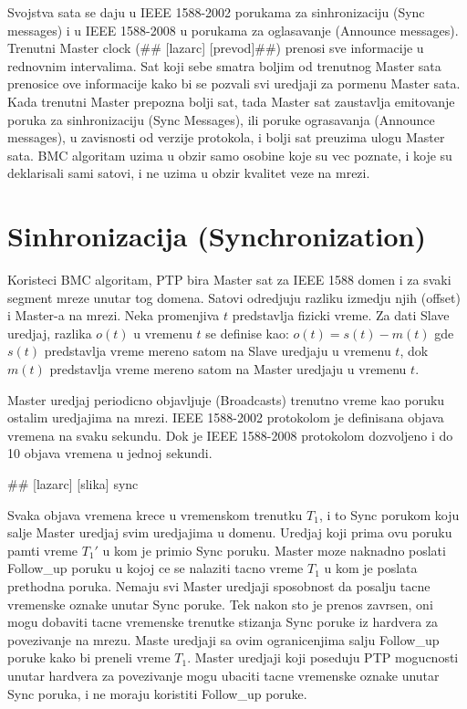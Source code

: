 \documentclass[a4paper,12pt, master]{etf}
\begin{document}
	Svojstva sata se daju u IEEE 1588-2002 porukama za sinhronizaciju (Sync messages) i u IEEE
	1588-2008 u porukama za oglasavanje (Announce messages). Trenutni Master clock (\#\#
	[lazarc] [prevod]\#\#) prenosi sve informacije u rednovnim intervalima. Sat koji sebe 
	smatra boljim od trenutnog Master sata prenosice ove informacije kako bi se pozvali svi 
	uredjaji za pormenu	Master sata. Kada trenutni Master prepozna bolji sat, tada Master sat 
	zaustavlja emitovanje poruka za sinhronizaciju (Sync Messages), ili poruke ograsavanja 
	(Announce messages), u zavisnosti od verzije protokola, i bolji sat preuzima ulogu Master 
	sata. BMC algoritam uzima u obzir samo osobine koje su vec poznate, i koje su deklarisali 
	sami satovi, i ne uzima u obzir	kvalitet veze na mrezi.

	\section{Sinhronizacija (Synchronization)}

	Koristeci BMC algoritam, PTP bira Master sat za IEEE 1588 domen i za svaki segment mreze 
	unutar tog domena.
	Satovi odredjuju razliku izmedju njih (offset) i Master-a na mrezi. Neka promenjiva $t$
	predstavlja fizicki vreme. Za dati Slave uredjaj, razlika $o(t)$ u vremenu $t$ se definise 
	kao:
	$o(t) = s(t) - m(t)$
	gde $s(t)$ predstavlja vreme mereno satom na Slave uredjaju u vremenu $t$, dok $m(t)$
	predstavlja vreme mereno satom na Master uredjaju u vremenu $t$.

	Master uredjaj periodicno objavljuje (Broadcasts) trenutno vreme kao poruku ostalim 
	uredjajima na mrezi. IEEE 1588-2002 protokolom je definisana objava vremena na svaku 
	sekundu. Dok je IEEE 1588-2008 protokolom dozvoljeno i do 10 objava vremena u jednoj 
	sekundi.

	\#\# [lazarc] [slika] sync

	Svaka objava vremena krece u vremenskom trenutku $T_1$, i to Sync porukom koju salje Master
	uredjaj svim uredjajima u domenu. Uredjaj koji prima ovu poruku pamti vreme $T_1'$ u kom je
	primio Sync poruku. Master moze naknadno poslati Follow\_up poruku u kojoj ce se nalaziti 
	tacno vreme $T_1$ u kom je poslata prethodna poruka. Nemaju svi Master uredjaji sposobnost 
	da posalju tacne vremenske oznake unutar Sync poruke. Tek nakon sto je prenos zavrsen, oni 
	mogu dobaviti tacne vremenske trenutke stizanja Sync poruke iz hardvera za povezivanje na 
	mrezu. Maste uredjaji sa ovim ogranicenjima salju Follow\_up poruke kako bi preneli vreme 
	$T_1$. Master uredjaji koji poseduju PTP mogucnosti unutar hardvera za povezivanje mogu 
	ubaciti tacne vremenske oznake unutar Sync poruka, i ne moraju koristiti Follow\_up poruke.
\end{document}
